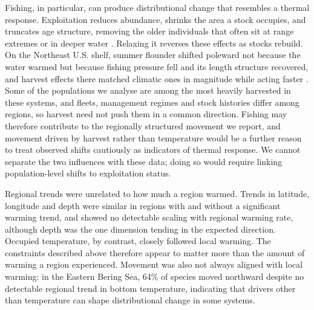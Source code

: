 \documentclass[9pt,twocolumn,twoside]{pnas-new}
\begin{document}
Fishing, in particular, can produce distributional change that resembles a thermal response. Exploitation reduces abundance, shrinks the area a stock occupies, and truncates age structure, removing the older individuals that often sit at range extremes or in deeper water \citep{bellDisentanglingEffectsClimate2015, engelhard_climate_2014}. Relaxing it reverses these effects as stocks rebuild. On the Northeast U.S. shelf, summer flounder shifted poleward not because the water warmed but because fishing pressure fell and its length structure recovered, and harvest effects there matched climatic ones in magnitude while acting faster \citep{bellDisentanglingEffectsClimate2015}. Some of the populations we analyse are among the most heavily harvested in these systems, and fleets, management regimes and stock histories differ among regions, so harvest need not push them in a common direction. Fishing may therefore contribute to the regionally structured movement we report, and movement driven by harvest rather than temperature would be a further reason to treat observed shifts cautiously as indicators of thermal response. We cannot separate the two influences with these data; doing so would require linking population-level shifts to exploitation status.

Regional trends were unrelated to how much a region warmed. Trends in latitude, longitude and depth were similar in regions with and without a significant warming trend, and showed no detectable scaling with regional warming rate, although depth was the one dimension tending in the expected direction. Occupied temperature, by contrast, closely followed local warming. The constraints described above therefore appear to matter more than the amount of warming a region experienced. Movement was also not always aligned with local warming: in the Eastern Bering Sea, 64\% of species moved northward despite no detectable regional trend in bottom temperature, indicating that drivers other than temperature can shape distributional change in some systems.
\end{document}
